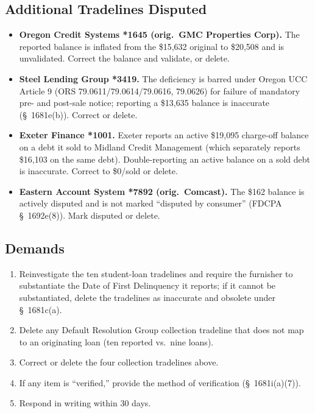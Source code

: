 \documentclass[12pt,letterpaper]{article}
\begin{document}
\subsection*{Additional Tradelines Disputed}
\begin{itemize}[noitemsep]
  \item \textbf{Oregon Credit Systems *1645 (orig.\ GMC Properties Corp).} The reported balance is inflated from the \$15,632 original to \$20,508 and is unvalidated. Correct the balance and validate, or delete.
  \item \textbf{Steel Lending Group *3419.} The deficiency is barred under Oregon UCC Article 9 (ORS 79.0611/79.0614/79.0616, 79.0626) for failure of mandatory pre- and post-sale notice; reporting a \$13,635 balance is inaccurate (\S~1681e(b)). Correct or delete.
  \item \textbf{Exeter Finance *1001.} Exeter reports an active \$19,095 charge-off balance on a debt it sold to Midland Credit Management (which separately reports \$16,103 on the same debt). Double-reporting an active balance on a sold debt is inaccurate. Correct to \$0/sold or delete.
  \item \textbf{Eastern Account System *7892 (orig.\ Comcast).} The \$162 balance is actively disputed and is not marked ``disputed by consumer'' (FDCPA \S~1692e(8)). Mark disputed or delete.
\end{itemize}

\subsection*{Demands}
\begin{enumerate}[label=\arabic*., leftmargin=*]
  \item Reinvestigate the ten student-loan tradelines and require the furnisher to substantiate the Date of First Delinquency it reports; if it cannot be substantiated, delete the tradelines as inaccurate and obsolete under \S~1681c(a).
  \item Delete any Default Resolution Group collection tradeline that does not map to an originating loan (ten reported vs.\ nine loans).
  \item Correct or delete the four collection tradelines above.
  \item If any item is ``verified,'' provide the method of verification (\S~1681i(a)(7)).
  \item Respond in writing within 30 days.
\end{enumerate}
\end{document}
